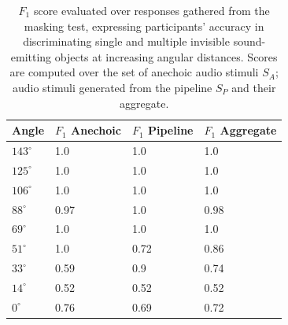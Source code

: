 \begin{table}[htbp]
\centering
\begin{tabular}{@{}llll@{}}
\toprule
Angle       & $F_1$ Anechoic & $F_1$ Pipeline & $F_1$ Aggregate \\ \midrule
$143^\circ$ & 1.0            & 1.0            & 1.0             \\
$125^\circ$ & 1.0            & 1.0            & 1.0             \\
$106^\circ$ & 1.0            & 1.0            & 1.0             \\
$ 88^\circ$ & 0.97           & 1.0            & 0.98            \\
$ 69^\circ$ & 1.0            & 1.0            & 1.0             \\
$ 51^\circ$ & 1.0            & 0.72           & 0.86            \\
$ 33^\circ$ & 0.59           & 0.9            & 0.74            \\
$ 14^\circ$ & 0.52           & 0.52           & 0.52            \\
$  0^\circ$ & 0.76           & 0.69           & 0.72            \\ \bottomrule
\end{tabular}
\caption{$F_1$ score evaluated over responses gathered from the masking test, expressing participants' accuracy in discriminating single and multiple invisible sound-emitting objects at increasing angular distances. Scores are computed over the set of anechoic audio stimuli $S_A$; audio stimuli generated from the pipeline $S_P$ and their aggregate.}
\label{tab:f1-masking}
\end{table}

